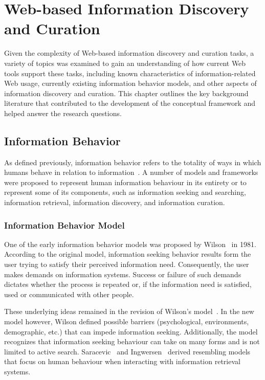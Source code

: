 \chapter{Web-based Information Discovery and Curation}
\label{chapter:chapter_related_work}

Given the complexity of Web-based information discovery and curation tasks, a variety of topics was examined to gain an understanding of how current Web tools support these tasks, including known characteristics of information-related Web usage, currently existing information behavior models, and other aspects of information discovery and curation.  This chapter outlines the key background literature that contributed to the development of the conceptual framework and helped answer the research questions. 

{\section{Information Behavior}
As defined previously, information behavior refers to the totality of ways in which humans behave in relation to information~\cite{wilson2000human}.  A number of models and frameworks were proposed to represent human information behaviour in its entirety or to represent some of its components, such as information seeking and searching, information retrieval, information discovery, and information curation. 


{\subsection{Information Behavior Model}
One of the early information behavior models was proposed by Wilson~\cite{wilson1981user} in 1981. According to the original model, information seeking behavior results form the user trying to satisfy their perceived information need. Consequently, the user makes demands on information systems. Success or failure of such demands dictates whether the process is repeated or, if the information need is satisfied, used or communicated with other people. 

These underlying ideas remained in the revision of Wilson's model~\cite{wilson1997information}. In the new model however, Wilson defined possible barriers (psychological, environments, demographic, etc.) that can impede information seeking. Additionally, the model recognizes that information seeking behaviour can take on many forms and is not limited to active search. Saracevic~\cite{saracevic1996modeling} and Ingwersen~\cite{ingwersen1996cognitive} derived resembling models that focus on human behaviour when interacting with information retrieval systems. 
} %

}
